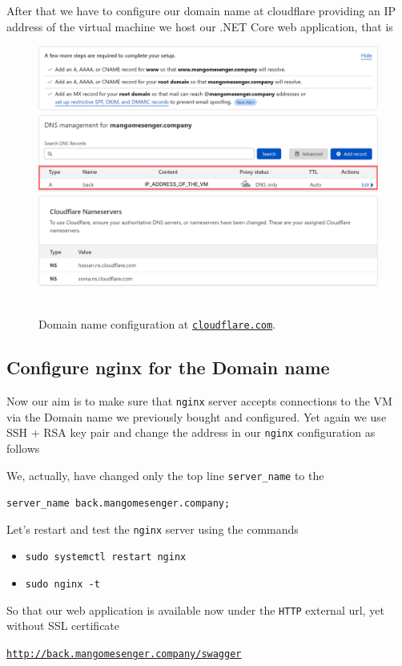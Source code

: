 After that we have to configure our domain name at cloudflare providing an IP address of the virtual machine we host
our .NET Core web application, that is
\begin{figure}[H]
    \centering
    \includegraphics[width=1\textwidth]{img/07_domain_at_cloudflare_com}
    ~\caption{Domain name configuration at \href{https://www.cloudflare.com/}{\texttt{cloudflare.com}}.}\label{fig:figure19}
\end{figure}

\subsection{Configure nginx for the Domain name}\label{subsec:configure-nginx-for-the-domain-name}
Now our aim is to make sure that \texttt{nginx} server accepts connections to the VM via the Domain name we
previously bought and configured.
Yet again we use SSH + RSA key pair and change the address in our \texttt{nginx} configuration as follows

We, actually, have changed only the top line \texttt{server\_name} to the
\begin{center}
    \texttt{server\_name back.mangomesenger.company;}
\end{center}
Let's restart and test the \texttt{nginx} server using the commands
\begin{itemize}
    \item \texttt{sudo systemctl restart nginx}
    \item \texttt{sudo nginx -t}
\end{itemize}
So that our web application is available now under the \texttt{HTTP} external url, yet without SSL certificate
\begin{center}
    \href{http://back.mangomesenger.company/swagger}{\texttt{http://back.mangomesenger.company/swagger}}
\end{center}